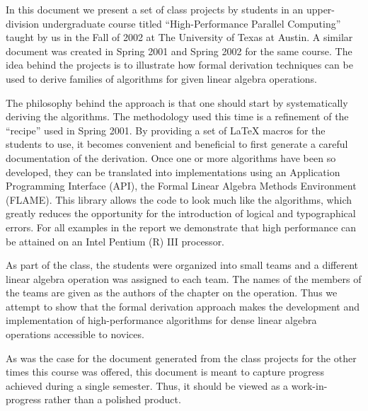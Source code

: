In this document we present a set of class projects by students in
an upper-division undergraduate course titled ``High-Performance
Parallel Computing'' taught by us in the Fall of 2002 at The
University of Texas at Austin.  A similar document was created in
Spring 2001 and Spring 2002 for the same course.  
The idea behind the projects is to
illustrate how formal derivation techniques can be used to derive
families of algorithms for given linear algebra operations.

The philosophy behind the approach is that one should start by
systematically deriving the algorithms.  The methodology used
this time is a refinement of the ``recipe'' used in Spring 2001.
By providing a set of \LaTeX\nocite{LATEX}
macros for the students to use, it becomes convenient and
beneficial to first generate a careful documentation of the
derivation.  Once one or more algorithms have been so
developed, they can be translated into implementations 
using an Application Programming Interface (API),
the Formal Linear Algebra Methods Environment
(FLAME).  This library allows the code to look much like the
algorithms, which greatly reduces the opportunity for
the introduction of logical and typographical errors.  
For all examples in the report we
demonstrate that high performance can be attained on an Intel Pentium
(R) III processor.

As part of the class, the students were organized into
small teams and a different linear algebra operation
was assigned to each team.
The names of the members of the
teams are given as the authors of the chapter on the operation.
Thus we attempt to show that the formal derivation approach makes the
development and implementation of high-performance
algorithms for dense linear algebra operations accessible to
novices.

As was the case for the document generated from the 
class projects for the other times this course
was offered,
this document is meant to capture progress achieved
during a single semester.  Thus, it should
be viewed as a work-in-progress rather than a polished
product.
